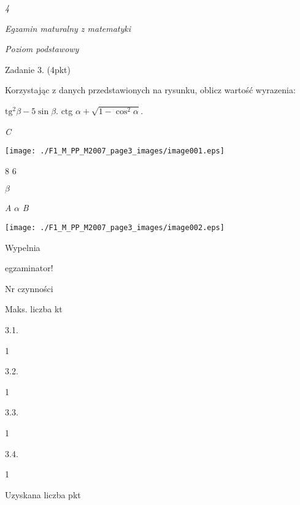 \documentclass[a4paper,12pt]{article}
\begin{document}
{\it 4}

{\it Egzamin maturalny z matematyki}

{\it Poziom podstawowy}

Zadanie 3. (4pkt)

Korzystając z danych przedstawionych na rysunku, oblicz wartość wyrazenia:

$\mathrm{t}\mathrm{g}^{2}\beta-5\sin\beta$. ctg $\alpha+\sqrt{1-\cos^{2}\alpha}.$

{\it C}
\begin{center}
\texttt{[image: ./F1\_M\_PP\_M2007\_page3\_images/image001.eps]}
\end{center}
8  6

$\beta$

{\it A}  $\alpha$  {\it B}
\begin{center}
\texttt{[image: ./F1\_M\_PP\_M2007\_page3\_images/image002.eps]}
\end{center}
Wypelnia

egzaminator!

Nr czynności

Maks. liczba kt

3.1.

1

3.2.

1

3.3.

1

3.4.

1

Uzyskana liczba pkt
\end{document}
